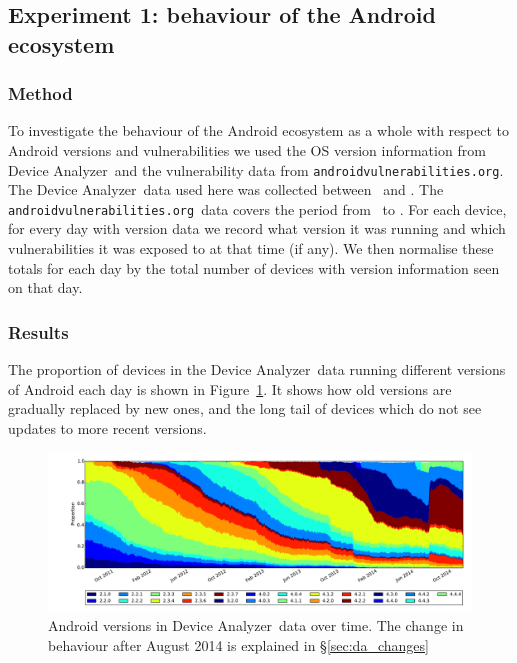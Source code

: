 \documentclass[conference,a4paper,twoside]{IEEEtran}
\newcommand{\da}{Device Analyzer}
\newcommand{\avo}{\texttt{androidvulnerabilities.org}}
\begin{document}

\subsection{Experiment 1: behaviour of the Android ecosystem}\label{sec:exp:android_ecosystem}

\subsubsection{Method}
To investigate the behaviour of the Android ecosystem as a whole with respect to Android versions and vulnerabilities we used the OS version information from \da\ and the vulnerability data from \avo.
The \da\ data used here was collected between \daStartDate\ and \daEndDate.
The \avo\ data covers the period from \avoFirstDataDate\ to \avoLastDataDate.
For each device, for every day with version data we record what version it was running and which vulnerabilities it was exposed to at that time (if any).
We then normalise these totals for each day by the total number of devices with version information seen on that day.

\subsubsection{Results}
The proportion of devices in the \da\ data running different versions of Android each day is shown in Figure~\ref{fig:norm_os}.
It shows how old versions are gradually replaced by new ones, and the long tail of devices which do not see updates to more recent versions.

\begin{figure}
 \centering
 \includegraphics[width=\textwidth]{figures/da_norm_os}
 \caption{Android versions in \da\ data over time. The change in behaviour after August 2014 is explained in \S\ref{sec:da_changes}}
 \label{fig:norm_os}
\end{figure}
\end{document}
